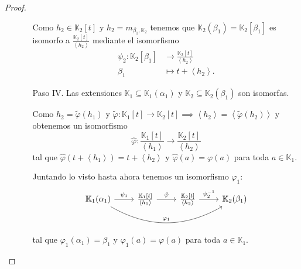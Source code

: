 \documentclass[10pt, spanish]{report}
\theoremstyle{definition}
\theoremstyle{custom}
\theoremstyle{remark}
\newcommand{\K}{\mathbb{K}}
\begin{document}
\begin{proof}
\begin{itemize}[itemindent=30pt]
\begin{enumerate}[itemindent=24pt]
                    Como $h_2\in\K_2[t]$  y $h_2=m_{\beta_1,\K_2}$ tenemos que
                    $\K_2(\beta_1)=\K_2[\beta_1]$ es isomorfo a
                    $\frac{\K_2[t]}{\left< h_2 \right> }$ mediante el
                    isomorfismo
                    \begin{align*}
                        \psi_2: \K_2[\beta_1]&\to \frac{\K_2[t]}{\left< h_2
                        \right>}\\
                            \beta_1&\mapsto t+\left<h_2\right>.
                    \end{align*}

                \item[Paso IV.] Las extensiones $\K_1\subseteq\K_1(\alpha_1)$ y
                    $\K_2\subseteq\K_2(\beta_1)$ son isomorfas.

                    Como $h_2=\tilde{\varphi}(h_1)$ y
                    $\tilde{\varphi}:\K_1[t]\to \K_2[t]\implies\left<h_2\right>
                    = \left< \tilde{\varphi}(h_2) \right> $ y obtenemos un
                    isomorfismo \[\hat{\varphi}:\frac{\K_1[t]}{\left<h_1\right>}
                    \to \frac{\K_2[t]}{\left<h_2\right>}\] tal que
                    $\hat{\varphi}(t+\left< h_1 \right> )=t+\left< h_2 \right>$
                    y $\hat{\varphi}(a)=\varphi(a)$ para toda $a\in\K_1$.

                    Juntando lo visto hasta ahora tenemos un isomorfismo
                    $\varphi_1$:
                    \[\begin{tikzcd}
                        \K_1(\alpha_1)\ar{r}{\psi_1}\ar[bend right]{rrr}{\varphi_1}&
                    \frac{\K_1[t]}{\left<h_1\right>}\ar{r}{\hat{\varphi}}&
                    \frac{\K_2[t]}{\left<h_2\right>}\ar{r} {\psi_2^{-1}}&
                        \K_2(\beta_1)
                    \end{tikzcd}\]
                    tal que $\varphi_1(\alpha_1)=\beta_1$ y
                    $\varphi_1(a)=\varphi(a)$ para toda $a\in\K_1$.


\end{enumerate}
\end{itemize}
\end{proof}
\end{document}

